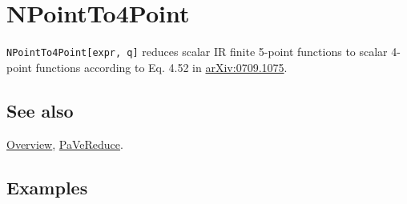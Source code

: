 \documentclass[../FeynCalcManual.tex]{subfiles}
\begin{document}
\hypertarget{npointto4point}{
\section{NPointTo4Point}\label{npointto4point}}

\texttt{NPointTo4Point[\allowbreak{}expr,\ \allowbreak{}q]} reduces
scalar IR finite 5-point functions to scalar 4-point functions according
to Eq. 4.52 in \href{https://arxiv.org/abs/0709.1075}{arXiv:0709.1075}.

\subsection{See also}

\hyperlink{toc}{Overview}, \hyperlink{pavereduce}{PaVeReduce}.

\subsection{Examples}

\begin{Shaded}
\begin{Highlighting}[]
\OperatorTok{[]} 
 
\OperatorTok{[}\OperatorTok{]} \ExtensionTok{=} \NormalTok{; }
 
\OperatorTok{[}\OperatorTok{,}\OperatorTok{]} \ExtensionTok{=} \NormalTok{; }
 
\OperatorTok{[}\OperatorTok{,}\OperatorTok{]} \ExtensionTok{=} \NormalTok{; }
 
\OperatorTok{[}\OperatorTok{,}\OperatorTok{]} \ExtensionTok{=} \NormalTok{; }
 
\OperatorTok{[}\OperatorTok{,}\OperatorTok{]} \ExtensionTok{=} \NormalTok{; }
 
\ExtensionTok{=}\OperatorTok{[}\OperatorTok{[\{}\OperatorTok{,}\OperatorTok{\},} \OperatorTok{\{} \SpecialCharTok{+}\OperatorTok{,} \OperatorTok{\},} \OperatorTok{\{} \SpecialCharTok{+}\OperatorTok{,} \OperatorTok{\},} \OperatorTok{\{} \SpecialCharTok{+}\OperatorTok{,} \OperatorTok{\},} \OperatorTok{\{} \SpecialCharTok{+}\OperatorTok{,} \OperatorTok{\}]]}
\end{Highlighting}
\end{Shaded}
\end{document}
